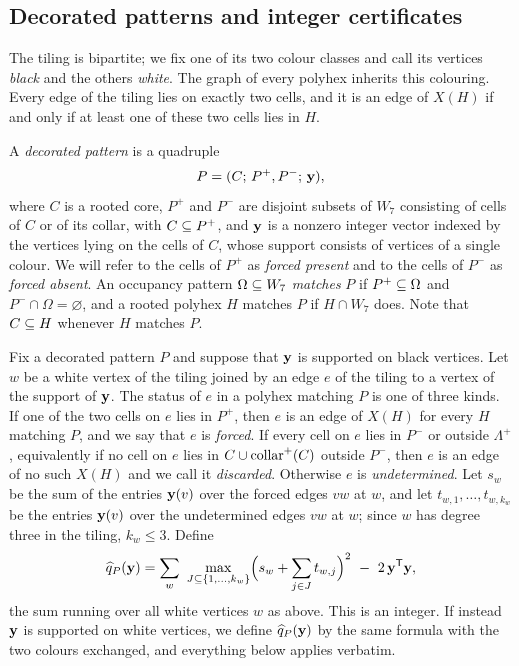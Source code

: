 \documentclass[11pt]{article}
\newcommand\tp{^{\mathsf T}}
\newcommand\collarp{\opk{collar}^{+}}
\theoremstyle{definition}
\begin{document}
\subsection{Decorated patterns and integer certificates}\label{sec:patterns}

The tiling is bipartite; we fix one of its two colour classes and call its
vertices \textsl{black} and the others \textsl{white}.  The graph of every
polyhex inherits this colouring.  Every edge of the tiling lies on exactly
two cells, and it is an edge of $X(H)$ if and only if at least one of these
two cells lies in $H$.

A \textsl{decorated pattern} is a quadruple
\[
 P=(C;\,P^{+},P^{-};\,{\mathbf y}),
\]
where $C$ is a rooted core, $P^{+}$ and $P^{-}$ are disjoint subsets of $W_7$
consisting of cells of $C$ or of its collar, with $C\subseteq P^{+}$, and ${\mathbf y}$ is
a nonzero integer vector indexed by the vertices lying on the cells of $C$,
whose support consists of vertices of a single colour.  We will refer to the
cells of $P^{+}$ as \textsl{forced present} and to the cells of $P^{-}$ as
\textsl{forced absent}.  An occupancy pattern $\Omega\subseteq W_7$ \textsl{matches}
$P$ if $P^{+}\subseteq \Omega$ and $P^{-}\cap \Omega=\varnothing$, and a rooted polyhex $H$
matches $P$ if $H\cap W_7$ does.  Note that $C\subseteq H$ whenever $H$ matches
$P$.

Fix a decorated pattern $P$ and suppose that ${\mathbf y}$ is supported on black
vertices.  Let $w$ be a white vertex of the tiling joined by an edge $e$ of
the tiling to a vertex of the support of ${\mathbf y}$.  The status of $e$ in a
polyhex matching $P$ is one of three kinds.  If one of the two cells on $e$
lies in $P^{+}$, then $e$ is an edge of $X(H)$ for every $H$ matching $P$,
and we say that $e$ is \textsl{forced}.  If every cell on $e$ lies in $P^{-}$
or outside $\Lambda^{+}$, equivalently if no cell on $e$ lies in
$C\cup\collarp(C)$ outside $P^{-}$, then $e$ is an edge of no such $X(H)$ and
we call it \textsl{discarded}.  Otherwise $e$ is \textsl{undetermined}.  Let $s_w$ be the sum of the
entries ${\mathbf y}(v)$ over the forced edges $vw$ at $w$, and let
$t_{w,1},\ldots,t_{w,k_w}$ be the entries ${\mathbf y}(v)$ over the undetermined
edges $vw$ at $w$; since $w$ has degree three in the tiling, $k_w\le3$.
Define
\begin{equation}\label{eq:qhat}
 \widehat q_P(\Zy)
 =\sum_{w}\ \max_{J\sbs\{1,\ldots,k_w\}}
 \Bigl(s_w+\sum_{j\in J}t_{w,j}\Bigr)^{2}\ -\ 2\,\Zy\tp\Zy ,
\end{equation}
the sum running over all white vertices $w$ as above.  This is an integer.
If instead ${\mathbf y}$ is supported on white vertices, we define
$\widehat q_P({\mathbf y})$ by the same formula with the two colours exchanged, and
everything below applies verbatim.
\end{document}
